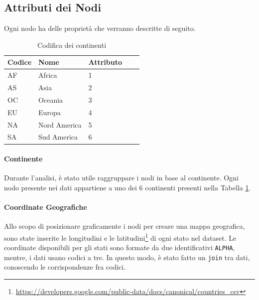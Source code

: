 \documentclass[]{article}
\begin{document}
\begin{multicols}{2}
	\subsection{Attributi dei Nodi}
	Ogni nodo ha delle proprietà che verranno descritte di seguito.
	\begin{table}[H]
		\centering
		\caption{Codifica dei continenti}
		\label{continent}
		\begin{tabular}{@{}lllll@{}}
			\toprule
			Codice & Nome & Attributo \\ \midrule
			AF & Africa & 1 \\
			AS & Asia & 2 \\
			OC & Oceania & 3 \\
			EU & Europa & 4 \\
			NA & Nord America & 5 \\
			SA & Sud America & 6 \\  \bottomrule
			\hline 
		\end{tabular}
	\end{table}
	\paragraph{Continente} Durante l'analisi, è stato utile raggruppare i nodi in base al continente. Ogni nodo presente nei dati appartiene a uno dei 6 continenti presenti nella Tabella \ref{continent}.
	\paragraph{Coordinate Geografiche}
	Allo scopo di posizionare graficamente i nodi per creare una mappa geografica, sono state inserite le longitudini e le latitudini\footnote{\url{https://developers.google.com/public-data/docs/canonical/countries_csv}} di ogni stato nel dataset. Le coordinate disponibili per gli stati sono formate da due identificativi \texttt{ALPHA}, mentre, i dati usano codici a tre. In questo modo, è stato fatto un \texttt{join} tra dati, conoscendo le corrispondenze fra codici.

\end{multicols}
\end{document}
